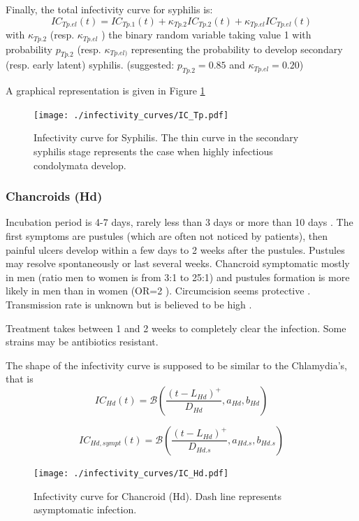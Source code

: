 \documentclass[11pt, onecolumn]{article}
\begin{document}
Finally, the total infectivity curve for syphilis is:
$$IC_{Tp.el}(t) = IC_{Tp.1}(t) +\kappa_{Tp.2}IC_{Tp.2}(t) +\kappa_{Tp.el}IC_{Tp.el}(t) $$
with $\kappa_{Tp.2}$ (resp. $\kappa_{Tp.el}$ ) the binary random variable taking value 1 with probability $p_{Tp.2}$ (resp. $\kappa_{Tp.el)}$ representing the probability to develop secondary (resp. early latent) syphilis. (suggested: $p_{Tp.2}=0.85$ and $\kappa_{Tp.el}=0.20$)

A graphical representation is given in Figure \ref{fig:ICTp}

\begin{figure}[!ht]
\centering
    \texttt{[image: ./infectivity\_curves/IC\_Tp.pdf]}
\caption{Infectivity curve for Syphilis. The thin curve in the secondary syphilis stage represents the case when highly infectious condolymata develop.}
\label{fig:ICTp}
\end{figure} 

\subsubsection{Chancroids (Hd)}

 Incubation period is 4-7 days, rarely less than 3 days or more than 10 days \cite{Sakuma:2011gx,Morse:1989io}. The first symptoms are pustules (which are often not noticed by patients), then painful ulcers develop within a few days to 2 weeks \cite{Sakuma:2011gx} after the pustules. Pustules may resolve spontaneously or last several weeks\cite{Spinola:2002kn}. Chancroid symptomatic mostly in men (ratio men to women is from 3:1 to 25:1) \cite{Sakuma:2011gx} and pustules formation is more likely in men than in women (OR=2 \cite{Spinola:2002kn}).
Circumcision seems protective \cite{Hammond:1980uz}. Transmission rate is unknown but is believed to be high \cite{Spinola:2002kn}. 

Treatment takes between 1 and 2 weeks to completely clear the infection. Some strains may be antibiotics resistant.


The shape of the infectivity curve is supposed to be similar to the Chlamydia's, that is
$$IC_{Hd}(t) = \mathcal{B}\left(\frac{(t-L_{Hd})^+}{D_{Hd}},a_{Hd},b_{Hd}\right)$$

$$IC_{Hd,sympt}(t) = \mathcal{B}\left(\frac{(t-L_{Hd})^+}{D_{Hd.s}},a_{Hd.s},b_{Hd.s}\right)$$

\begin{figure}[!ht]
\centering
   \texttt{[image: ./infectivity\_curves/IC\_Hd.pdf]}
\caption{Infectivity curve for Chancroid (Hd). Dash line represents asymptomatic infection.}
\label{fig:ICHd}
\end{figure}
\end{document}
